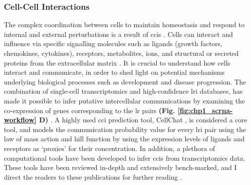 \subsubsection{Cell-Cell Interactions}
\par The complex coordination between cells to maintain homeostasis and respond to internal and external perturbations is a result of \glspl{cci} \textbf{\cite{armingol_deciphering_2021}}.  %
Cells can interact and influence via specific signalling molecules such as ligands (growth factors, chemokines, cytokines), receptors, metabolites, ions, and structural or secreted proteins from the extracellular matrix \textbf{\cite{armingol_deciphering_2021,armingol_diversification_2024}}. %
It is crucial to understand how cells interact and communicate, in order to shed light on potential mechanisms underlying biological processes such as development and disease progression. The combination of single-cell transcriptomics and high-confidence \gls{lri} databases, has made it possible to infer putative intercellular communications by examining the co-expression of genes corresponding to the \gls{lr} pairs \textbf{(Fig. \ref{fig:chp1_scrna-workflow} D)} \textbf{\cite{wilk_comparative_2023}}. A highly used \gls{cci} prediction tool, CellChat \textbf{\cite{jin_inference_2021}}, is considered a core tool, and models the communication probability value for every \gls{lri} pair using the law of mass action and hill function by using the expression levels of ligands and receptors as `proxies' for their concentration. In addition, a plethora of computational tools have been developed to infer \glspl{cci} from transcriptomics data. These tools have been reviewed in-depth and extensively bench-marked, and I direct the readers to these publications for further reading \textbf{\cite{armingol_deciphering_2021,armingol_diversification_2024,liu_evaluation_2022,xie_comparison_2023,cheng_review_2023}}.\\

